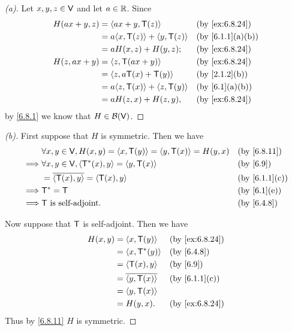 \begin{proof}[(a)]
  Let \(x, y, z \in \mathsf{V}\) and let \(a \in \mathbb{R}\).
  Since
  \begin{align*}
    H(ax + y, z) & = \inn{ax + y, \T(z)}               &  & \by{ex:6.8.24}  \\
                 & = a \inn{x, \T(z)} + \inn{y, \T(z)} &  & \by{6.1.1}[a,b] \\
                 & = a H(x, z) + H(y, z);              &  & \by{ex:6.8.24}  \\
    H(z, ax + y) & = \inn{z, \T(ax + y)}               &  & \by{ex:6.8.24}  \\
                 & = \inn{z, a \T(x) + \T(y)}          &  & \by{2.1.2}[b]   \\
                 & = a \inn{z, \T(x)} + \inn{z, \T(y)} &  & \by{6.1}[a,b]   \\
                 & = a H(z, x) + H(z, y),              &  & \by{ex:6.8.24}
  \end{align*}
  by \cref{6.8.1} we know that \(H \in \mathcal{B}(\mathsf{V})\).
\end{proof}

\begin{proof}[(b)]
  First suppose that \(H\) is symmetric.
  Then we have
  \begin{align*}
             & \forall x, y \in \V, H(x, y) = \inn{x, \T(y)} = \inn{y, \T(x)} = H(y, x) &  & \by{6.8.11}   \\
    \implies & \forall x, y \in \V, \inn{\T^*(x), y} = \inn{y, \T(x)}                   &  & \by{6.9}      \\
             & = \conj{\inn{\T(x), y}} = \inn{\T(x), y}                                 &  & \by{6.1.1}[c] \\
    \implies & \T^* = \T                                                                &  & \by{6.1}[e]   \\
    \implies & \T \text{ is self-adjoint}.                                              &  & \by{6.4.8}
  \end{align*}

  Now suppose that \(\mathsf{T}\) is self-adjoint.
  Then we have
  \begin{align*}
    H(x, y) & = \inn{x, \T(y)}        &  & \by{ex:6.8.24} \\
            & = \inn{x, \T^*(y)}      &  & \by{6.4.8}     \\
            & = \inn{\T(x), y}        &  & \by{6.9}       \\
            & = \conj{\inn{y, \T(x)}} &  & \by{6.1.1}[c]  \\
            & = \inn{y, \T(x)}                            \\
            & = H(y, x).              &  & \by{ex:6.8.24}
  \end{align*}
  Thus by \cref{6.8.11} \(H\) is symmetric.
\end{proof}

